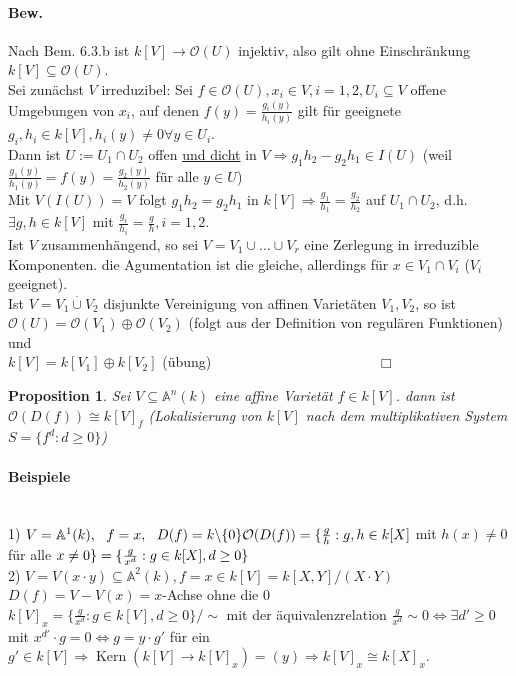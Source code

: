 \documentclass[a4paper,12pt]{report}
\theoremstyle{break}
\newtheorem{Prop}[Def]{Proposition}
\theoremstyle{nonumberbreak}
\theoremstyle{nonumberplain}
\begin{document}
\paragraph{Bew.} Nach Bem. 6.3.b ist $k[V] \rightarrow \mathcal{O}(U)$ injektiv, also gilt ohne Einschränkung $k[V]\subseteq \mathcal{O}(U)$.\\
Sei zunächst $V$ irreduzibel: Sei $f\in \mathcal{O}(U), x_i\in V, i=1,2, U_i\subseteq V$ offene Umgebungen von $x_i$, auf denen $f(y)=\frac{g_i(y)}{h_i(y)}$ gilt für geeignete $g_i,h_i\in k[V], h_i(y)\neq 0 \forall y\in U_i$.\\
Dann ist $U:=U_1\cap U_2$ offen \underline{und dicht} in $V \Rightarrow g_1h_2-g_2h_1\in I(U)$ (weil $\frac{g_1(y)}{h_1(y)}=f(y)=\frac{g_2(y)}{h_2(y)}$ für alle $y\in U$)\\
Mit $V(I(U))=V$ folgt $g_1h_2=g_2h_1$ in $k[V]\Rightarrow \frac{g_1}{h_1}=\frac{g_2}{h_2}$ auf $U_1\cap U_2$, d.h. $\exists g,h\in k[V]$ mit $\frac{g_i}{h_i}=\frac{g}{h}, i=1,2$.\\
Ist $V$ zusammenhängend, so sei $V=V_1\cup ... \cup V_r$ eine Zerlegung in irreduzible Komponenten. die Agumentation ist die gleiche, allerdings für $x\in V_1\cap V_i$ ($V_i$ geeignet).\\
Ist  $V=V_1\stackrel{\cdot}{\cup} V_2$ disjunkte Vereinigung von affinen Varietäten $V_1,V_2$, so ist\\
$\mathcal{O}(U)=\mathcal{O}(V_1)\oplus\mathcal{O}(V_2)$ (folgt aus der Definition von regulären Funktionen) und\\
$k[V]=k[V_1]\oplus k[V_2]$ (übung) $~~~~~~~~~~~~~~~~~~~~~~~~~~~~~~~~~~~~~~~~~~~~~~~~~~~~\Box$
\begin{Prop}
Sei $V\subseteq\mathbb{A}^n(k)$ eine affine Varietät $f\in k[V]$. dann ist $\mathcal{O}(D(f))\cong k[V]_f$ (Lokalisierung von $k[V]$ nach dem multiplikativen System $S=\{f^d: d\geq 0\}$)
\end{Prop}
\paragraph{Beispiele}~\\
1) $V=\mathbb{A}^1(k),~~f=x,~~ D(f)=k\backslash \{0\}\\
\mathcal{O}(D(f))=\{\frac{g}{h}: g,h\in k[X]$ mit $h(x)\neq 0$ für alle $x\neq 0\}\\
=\{\frac{g}{x^d}: g\in k[X], d\geq 0\}$\\
2) $V=V(x\cdot y)\subseteq \mathbb{A}^2(k), f=x\in k[V]=k[X,Y]/(X\cdot Y)$\\
$D(f)=V-V(x)= x$-Achse ohne die $0$\\
$k[V]_x=\{\frac{g}{x^d}: g\in k[V], d\geq 0\}/\sim$ mit der äquivalenzrelation $\frac{g}{x^d} \sim 0\Leftrightarrow \exists d'\geq 0$ mit $x^{d'}\cdot g=0\Leftrightarrow g=y\cdot g'$ für ein $g'\in k[V]\Rightarrow \operatorname{Kern}(k[V]\rightarrow k[V]_x)=(y)\Rightarrow k[V]_x\cong k[X]_x$.
\end{document}
